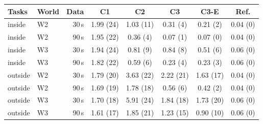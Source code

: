 \begin{tabular}{llrccccc}
\toprule
Tasks & World & Data & C1 & C2 & C3 & C3-E & Ref.\\
\midrule
inside & W2 & 30\,s & 1.99 (24) & 1.03 (11) & 0.31 (4) & 0.21 (2) & 0.04 (0)\\
inside & W2 & 90\,s & 1.95 (22) & 0.36 (4) & 0.07 (1) & 0.07 (0) & 0.04 (0)\\
inside & W3 & 30\,s & 1.94 (24) & 0.81 (9) & 0.84 (8) & 0.51 (6) & 0.06 (0)\\
inside & W3 & 90\,s & 1.82 (22) & 0.59 (6) & 0.23 (4) & 0.23 (3) & 0.06 (0)\\
\midrule
outside & W2 & 30\,s & 1.79 (20) & 3.63 (22) & 2.22 (21) & 1.63 (17) & 0.04 (0)\\
outside & W2 & 90\,s & 1.69 (19) & 1.78 (18) & 0.56 (6) & 0.42 (2) & 0.04 (0)\\
outside & W3 & 30\,s & 1.70 (18) & 5.91 (24) & 1.84 (18) & 1.73 (20) & 0.06 (0)\\
outside & W3 & 90\,s & 1.61 (17) & 1.85 (21) & 1.23 (15) & 0.90 (10) & 0.06 (0)\\
\bottomrule
\end{tabular}

